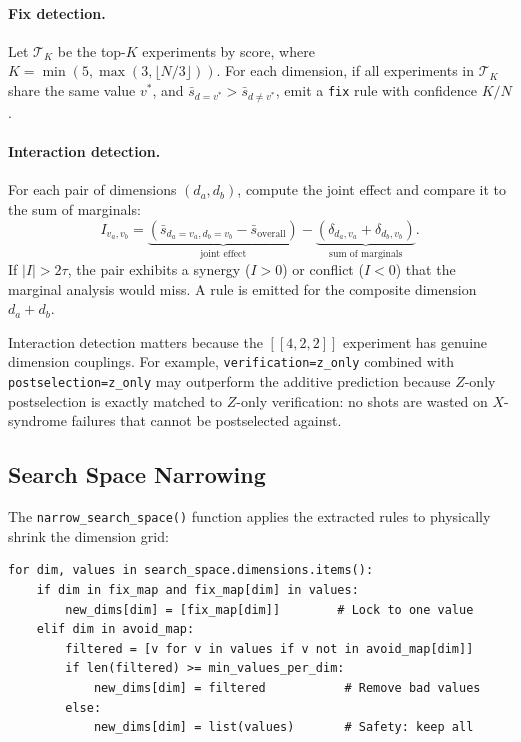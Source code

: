 \documentclass[11pt,a4paper]{article}
\newcommand{\code}[1]{\texttt{#1}}
\begin{document}
\paragraph{Fix detection.} Let $\mathcal{T}_K$ be the top-$K$ experiments by
score, where $K = \min(5, \max(3, \lfloor N/3 \rfloor))$. For each dimension,
if all experiments in $\mathcal{T}_K$ share the same value $v^*$, and
$\bar{s}_{d=v^*} > \bar{s}_{d \neq v^*}$, emit a \code{fix} rule with
confidence $K/N$.

\paragraph{Interaction detection.}
\label{sec:interactions}
For each pair of dimensions $(d_a, d_b)$, compute the joint effect and compare
it to the sum of marginals:
\begin{equation}
  I_{v_a, v_b} = \underbrace{(\bar{s}_{d_a=v_a, d_b=v_b} - \bar{s}_{\text{overall}})}_{\text{joint effect}}
               - \underbrace{(\delta_{d_a, v_a} + \delta_{d_b, v_b})}_{\text{sum of marginals}}.
  \label{eq:interaction}
\end{equation}
If $|I| > 2\tau$, the pair exhibits a synergy ($I > 0$) or conflict ($I < 0$)
that the marginal analysis would miss. A rule is emitted for the composite
dimension $d_a{+}d_b$.

\begin{keyconcept}
Interaction detection matters because the $[\![4,2,2]\!]$ experiment has
genuine dimension couplings. For example, \code{verification=z\_only} combined
with \code{postselection=z\_only} may outperform the additive prediction
because $Z$-only postselection is exactly matched to $Z$-only verification:
no shots are wasted on $X$-syndrome failures that cannot be postselected
against.
\end{keyconcept}

\subsection{Search Space Narrowing}
\label{sec:narrowing}

The \code{narrow\_search\_space()} function applies the extracted rules to
physically shrink the dimension grid:

\begin{lstlisting}[style=python]
for dim, values in search_space.dimensions.items():
    if dim in fix_map and fix_map[dim] in values:
        new_dims[dim] = [fix_map[dim]]        # Lock to one value
    elif dim in avoid_map:
        filtered = [v for v in values if v not in avoid_map[dim]]
        if len(filtered) >= min_values_per_dim:
            new_dims[dim] = filtered           # Remove bad values
        else:
            new_dims[dim] = list(values)       # Safety: keep all
\end{lstlisting}
\end{document}

